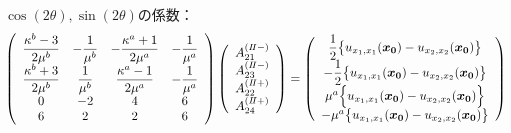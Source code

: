 $\cos(2\theta),\sin(2\theta)$の係数：
\begin{align}
	\left(
	\begin{array}{cccc}
		{\displaystyle\frac{ \kappa^b-3}{2\mu^{b}}}& {\displaystyle-\frac{1}{\mu^{b}}} &
		{\displaystyle-\frac{\kappa^a+1}{2\mu^{a}}} & {\displaystyle-\frac{1}{\mu^{a}}} \\
		{\displaystyle\frac{\kappa^b+3}{2\mu^{b}}} & {\displaystyle\frac{1}{\mu^{b}}} &
		{\displaystyle\frac{\kappa^a-1}{2\mu^{a}}} & {\displaystyle-\frac{1}{\mu^{a}}} \\
		0 & -2 & 4 & 6 \\
		6 & 2 & 2 & 6\\
	\end{array}
	\right)
	\left(
	\begin{array}{c}
		A_{21}^{(I\hspace{-.15em}I-)} \\
	 	A_{23}^{(I\hspace{-.15em}I-)} \\
		A_{22}^{(I\hspace{-.15em}I+)}\\
	 	A_{24}^{(I\hspace{-.15em}I+)} \\
	\end{array}
	\right)
	=
	\left(
	\begin{array}{c}
		{\displaystyle\frac{1}{2}\bigl\{u_{x_{1},x_{1}}(\bm{x_{0}})-u_{x_{2},x_{2}}(\bm{x_{0}})\bigr\}} \\
	 	{\displaystyle-\frac{1}{2}\bigl\{u_{x_{1},x_{1}}(\bm{x_{0}})-u_{x_{2},x_{2}}(\bm{x_{0}})\bigr\}} \\
		\mu^a\Bigl\{ u_{x_{1},x_{1}}(\bm{x_{0}})- u_{x_{2},x_{2}}(\bm{x_{0}})\Bigr\} \\
	 	-\mu^a \bigl\{u_{x_{1},x_{1}}(\bm{x_{0}})-u_{x_{2},x_{2}}(\bm{x_{0}})\bigr\} \\
	\end{array}
	\right)
\end{align}
